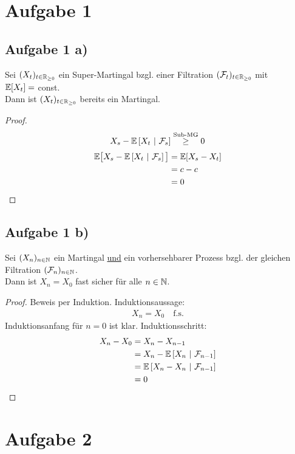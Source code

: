 \documentclass[12pt,a4paper]{article}
\author{Willi Sontopski}
\begin{document}

\section*{Aufgabe 1}
\subsection*{Aufgabe 1 a)}
Sei $(X_t)_{t\in\mathbb{R}_{\geq0}}$ ein Super-Martingal bzgl. einer Filtration $(\mathcal{F}_t)_{t\in\mathbb{R}_{\geq0}}$ mit\\ $\mathbb{E}[X_t]=$ const.\\
Dann ist $(X_t)_{t\in\mathbb{R}_{\geq0}}$ bereits ein Martingal.

\begin{proof}
	\begin{align*}
		X_s - \mathbb{E}\left[{X_t}~|~{\mathcal{F}_s}\right] \stackrel{\text{Sub-MG}}{\geq} 0
	\end{align*}
	\begin{align*}
		\mathbb{E}\big[X_s - \mathbb{E}\left[{X_t}~|~{\mathcal{F}_s}\right] \big]
		&= \mathbb{E}[X_s - X_t] \\
		&= c-c \\
		&= 0
	\end{align*}
\end{proof}

\subsection*{Aufgabe 1 b)}
Sei $(X_n)_{n\in\mathbb{N}}$ ein Martingal \underline{und} ein vorhersehbarer Prozess bzgl. der gleichen Filtration $(\mathcal{F}_n)_{n\in\mathbb{N}}$.\\
Dann ist $X_n=X_0$ fast sicher für alle $n\in\mathbb{N}$.

\begin{proof}
	Beweis per Induktion. 
	Induktionsaussage:
	\begin{align*}
		X_n = X_0 \quad \text{f.s.}
	\end{align*}
	Induktionsanfang für $n=0$ ist klar.
	Induktionsschritt:
	\begin{align*}
		X_n-X_0
		&= X_n - X_{n-1} \\
		&= X_n - \mathbb{E}\left[{X_n}~|~{\mathcal{F}_{n-1}}\right] \\
		&= \mathbb{E}\left[{X_n-X_n}~|~{\mathcal{F}_{n-1}}\right] \\
		&= 0
	\end{align*}

\end{proof}

\section*{Aufgabe 2}
\end{document}
